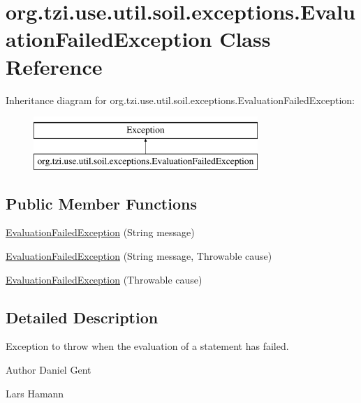 \hypertarget{classorg_1_1tzi_1_1use_1_1util_1_1soil_1_1exceptions_1_1_evaluation_failed_exception}{\section{org.\-tzi.\-use.\-util.\-soil.\-exceptions.\-Evaluation\-Failed\-Exception Class Reference}
\label{classorg_1_1tzi_1_1use_1_1util_1_1soil_1_1exceptions_1_1_evaluation_failed_exception}
}
Inheritance diagram for org.\-tzi.\-use.\-util.\-soil.\-exceptions.\-Evaluation\-Failed\-Exception\-:\begin{figure}[H]
\begin{center}
\leavevmode
\includegraphics[height=2.000000cm]{classorg_1_1tzi_1_1use_1_1util_1_1soil_1_1exceptions_1_1_evaluation_failed_exception}
\end{center}
\end{figure}
\subsection*{Public Member Functions}
\begin{DoxyCompactItemize}
\item 
\hyperlink{classorg_1_1tzi_1_1use_1_1util_1_1soil_1_1exceptions_1_1_evaluation_failed_exception_af0505abc749cf1d13c6c1d5c9e56eb62}{Evaluation\-Failed\-Exception} (String message)
\item 
\hyperlink{classorg_1_1tzi_1_1use_1_1util_1_1soil_1_1exceptions_1_1_evaluation_failed_exception_a88f95fc49a0bcdbd469c26cf831c1808}{Evaluation\-Failed\-Exception} (String message, Throwable cause)
\item 
\hyperlink{classorg_1_1tzi_1_1use_1_1util_1_1soil_1_1exceptions_1_1_evaluation_failed_exception_a9581dc61b7dbb21b1a85cb6f92686cc9}{Evaluation\-Failed\-Exception} (Throwable cause)
\end{DoxyCompactItemize}


\subsection{Detailed Description}
Exception to throw when the evaluation of a statement has failed. \begin{DoxyAuthor}{Author}
Daniel Gent 

Lars Hamann 
\end{DoxyAuthor}


